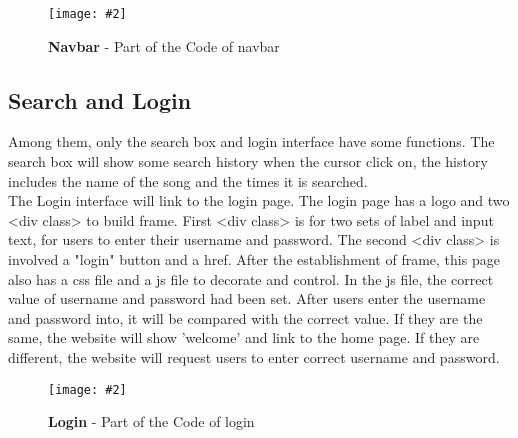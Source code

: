 \documentclass[10pt, a4paper]{article}
\newcommand{\figuremacro}[5]{
    \begin{figure}[#1]
        \centering
        \texttt{[image: \#2]}
        \caption[#3]{\textbf{#3}#4}
        \label{fig:#2}
    \end{figure}
}
\begin{document}
   \figuremacro{h}{1.JPG}{Navbar}{ - Part of the Code of navbar}{1.0}
	 
	\subsection{Search and Login}
    Among them, only the search box and login interface have some functions. The search box will show some search history when the cursor click on, the history includes the name of the song and the times it is searched. \\  The Login interface will link to the login page. The login page has a logo and two <div class> to build frame. First <div class> is for two sets of label and input text, for users to enter their username and password. The second <div class> is involved a "login" button and a href. After the establishment of frame, this page also has a css file and a js file to decorate and control. In the js file, the correct value of username and password had been set. After users enter the username and password into, it will be compared with the correct value. If they are the same, the website will show 'welcome' and link to the home page. If they are different, the website will request users to enter correct username and password.
    
    \figuremacro{h}{2.JPG}{Login}{ - Part of the Code of login }{1.0}
    
    
    
\end{document}
